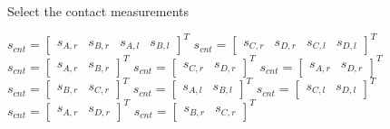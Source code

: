 \begin{algorithm}
    \caption{Select the contact measurements}
    \label{alg:cnt_switch}
    \begin{algorithmic}
        \RETURN $ s_{cnt}= \begin{bmatrix}s_{A,r} &s_{B,r} &s_{A,l} &s_{B,l} \end{bmatrix}^T$ 
        \RETURN $ s_{cnt}= \begin{bmatrix}s_{C,r} &s_{D,r} &s_{C,l} &s_{D,l} \end{bmatrix}^T$ 
        \ENDIF
        \RETURN $ s_{cnt}= \begin{bmatrix}s_{A,r} &s_{B,r}  \end{bmatrix}^T$ 
        \RETURN $ s_{cnt}= \begin{bmatrix}s_{C,r} &s_{D,r}  \end{bmatrix}^T$ 
        \RETURN $ s_{cnt}= \begin{bmatrix}s_{A,r} &s_{D,r}  \end{bmatrix}^T$ 
        \RETURN $ s_{cnt}= \begin{bmatrix}s_{B,r} &s_{C,r}  \end{bmatrix}^T$ 
        \ENDIF
        \RETURN $ s_{cnt}= \begin{bmatrix} s_{A,l} &s_{B,l} \end{bmatrix}^T$ 
        \RETURN $ s_{cnt}= \begin{bmatrix} s_{C,l} &s_{D,l} \end{bmatrix}^T$ 
        \RETURN $ s_{cnt}= \begin{bmatrix}s_{A,r} &s_{D,r}  \end{bmatrix}^T$ 
        \RETURN $ s_{cnt}= \begin{bmatrix}s_{B,r} &s_{C,r}  \end{bmatrix}^T$ 
        \ENDIF
    \ENDIF
    \end{algorithmic}
\end{algorithm}

